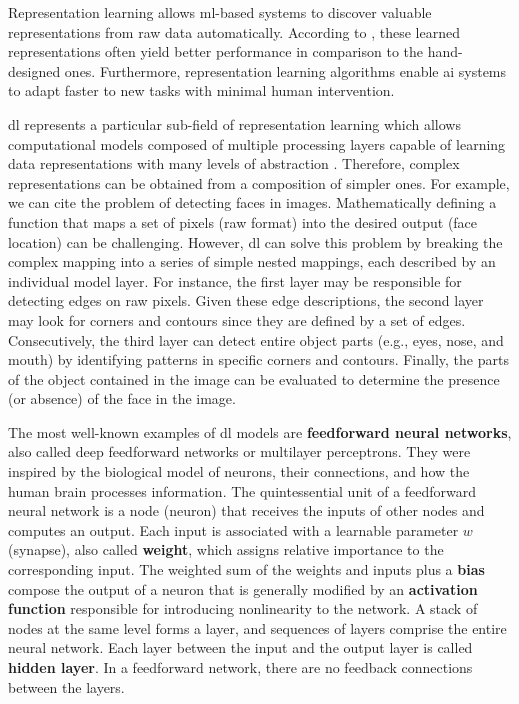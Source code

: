 Representation learning allows \acs{ml}-based systems to discover valuable representations from raw data automatically. According to \cite{goodfellow2016deep}, these learned representations often yield better performance in comparison to the hand-designed ones. Furthermore, representation learning algorithms enable \acs{ai} systems to adapt faster to new tasks with minimal human intervention.

\acf{dl} represents a particular sub-field of representation learning which allows computational models composed of multiple processing layers capable of learning data representations with many levels of abstraction \citep{lecun2015deep}. Therefore, complex representations can be obtained from a composition of simpler ones. For example, we can cite the problem of detecting faces in images. Mathematically defining a function that maps a set of pixels (raw format) into the desired output (face location) can be challenging. However, \acl{dl} can solve this problem by breaking the complex mapping into a series of simple nested mappings, each described by an individual model layer. For instance, the first layer may be responsible for detecting edges on raw pixels. Given these edge descriptions, the second layer may look for corners and contours since they are defined by a set of edges. Consecutively, the third layer can detect entire object parts (e.g., eyes, nose, and mouth) by identifying patterns in specific corners and contours. Finally, the parts of the object contained in the image can be evaluated to determine the presence (or absence) of the face in the image.

The most well-known examples of \acl{dl} models are \textbf{feedforward neural networks}, also called deep feedforward networks or multilayer perceptrons. They were inspired by the biological model of neurons, their connections, and how the human brain processes information. The quintessential unit of a feedforward neural network is a node (neuron) that receives the inputs of other nodes and computes an output. Each input is associated with a learnable parameter $w$ (synapse), also called \textbf{weight}, which assigns relative importance to the corresponding input. The weighted sum of the weights and inputs plus a \textbf{bias} compose the output of a neuron that is generally modified by an \textbf{activation function} responsible for introducing nonlinearity to the network. A stack of nodes at the same level forms a layer, and sequences of layers comprise the entire neural network. Each layer between the input and the output layer is called \textbf{hidden layer}. In a feedforward network, there are no feedback connections between the layers.

